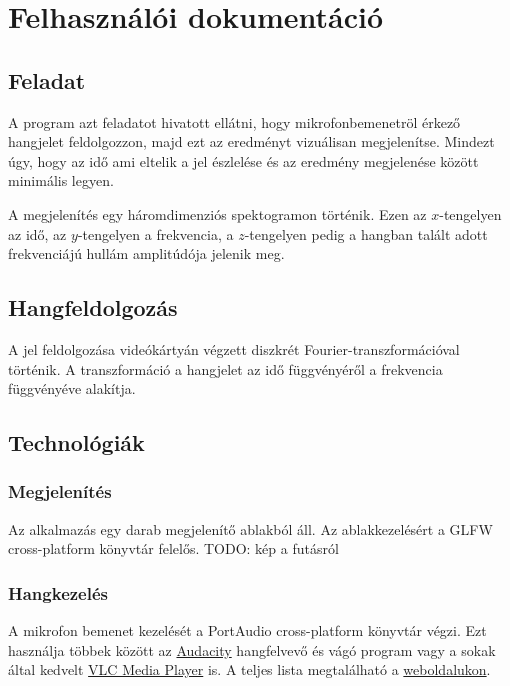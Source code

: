 
\section{Felhaszn\'al\'oi dokument\'aci\'o}
\subsection{Feladat}
A program azt feladatot hivatott ell\'atni, hogy mikrofonbemenetr\"ol \'erkez\H o hangjelet feldolgozzon, majd ezt az eredm\'enyt vizu\'alisan megjelen\'itse. Mindezt \'ugy, hogy az id\H o ami eltelik a jel \'eszlel\'ese \'es az eredm\'eny megjelen\'ese k\"oz\"ott minim\'alis legyen.

A megjelen\'it\'es egy h\'aromdimenzi\'os spektogramon t\"ort\'enik. Ezen az $x$-tengelyen az id\H o, az $y$-tengelyen a frekvencia, a $z$-tengelyen pedig a hangban tal\'alt adott frekvenci\'aj\'u hull\'am amplit\'ud\'oja jelenik meg.

\subsection{Hangfeldolgoz\'as}
A jel feldolgoz\'asa vide\'ok\'arty\'an v\'egzett diszkr\'et Fourier-transzform\'aci\'oval t\"ort\'enik. A transzform\'aci\'o a hangjelet az id\H o f\"uggv\'eny\'er\H ol a frekvencia f\"uggv\'eny\'eve alak\'itja. 


\subsection{Technol\'ogi\'ak}
\subsubsection{Megjelen\'it\'es}
Az alkalmaz\'as egy darab megjelen\'it\H o ablakb\'ol \'all. Az ablakkezel\'es\'ert a GLFW cross-platform k\"onyvt\'ar felel\H os.
TODO: k\'ep a fut\'asr\'ol

\subsubsection{Hangkezel\'es}
A mikrofon bemenet kezel\'es\'et a PortAudio cross-platform k\"onyvt\'ar v\'egzi. Ezt haszn\'alja t\"obbek k\"oz\"ott az \href{http://audacity.sourceforge.net}{Audacity} hangfelvev\H o \'es v\'ag\'o program vagy a sokak \'altal kedvelt \href{http://www.videolan.org/vlc/}{VLC Media Player} is. A teljes lista megtal\'alhat\'o a \href{http://www.portaudio.com/apps.html}{weboldalukon}.

